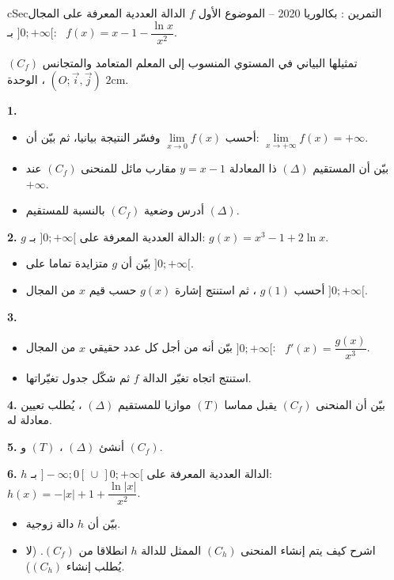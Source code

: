\documentclass[12pt,a4paper]{article}
\newenvironment{BOX}[2]{\begin{otherlanguage}{english}\begin{arbox}{#1}{#2}}{\end{arbox}\end{otherlanguage}}
\newcounter{exo}
\newenvironment{tamrin}[1]{\stepcounter{exo}\begin{BOX}{cSec}{التمرين \theexo: #1}}{\end{BOX}}
\newenvironment{sq}{\begin{itemize}[leftmargin=2.4em,itemsep=3pt]}{\end{itemize}}
\newcommand{\qa}{\item[(أ)]}\newcommand{\qb}{\item[(ب)]}\newcommand{\qc}{\item[(جـ)]}\newcommand{\qd}{\item[(د)]}\newcommand{\qe}{\item[(هـ)]}
\newcommand{\QQ}[1]{\par\smallskip\textbf{#1.} }
\begin{document}
\begin{tamrin}{بكالوريا 2020 -- الموضوع الأول}
$f$ الدالة العددية المعرفة على المجال $]0;+\infty[$ بـ: \ $f(x)=x-1-\dfrac{\ln x}{x^2}$.

$(C_f)$ تمثيلها البياني في المستوي المنسوب إلى المعلم المتعامد والمتجانس $(O;\vec i,\vec j)$ ، الوحدة $2\text{cm}$.
\QQ{1}
\begin{sq}
\qa أحسب $\lim\limits_{x\to0}f(x)$ وفسّر النتيجة بيانيا، ثم بيّن أن: $\lim\limits_{x\to+\infty}f(x)=+\infty$.
\qb بيّن أن المستقيم $(\Delta)$ ذا المعادلة $y=x-1$ مقارب مائل للمنحنى $(C_f)$ عند $+\infty$.
\qc أدرس وضعية $(C_f)$ بالنسبة للمستقيم $(\Delta)$.
\end{sq}
\QQ{2} $g$ الدالة العددية المعرفة على $]0;+\infty[$ بـ: $g(x)=x^3-1+2\ln x$.
\begin{sq}
\qa بيّن أن $g$ متزايدة تماما على $]0;+\infty[$.
\qb أحسب $g(1)$ ، ثم استنتج إشارة $g(x)$ حسب قيم $x$ من المجال $]0;+\infty[$.
\end{sq}
\QQ{3}
\begin{sq}
\qa بيّن أنه من أجل كل عدد حقيقي $x$ من المجال $]0;+\infty[$: \ $f'(x)=\dfrac{g(x)}{x^3}$.
\qb استنتج اتجاه تغيّر الدالة $f$ ثم شكّل جدول تغيّراتها.
\end{sq}
\QQ{4} بيّن أن المنحنى $(C_f)$ يقبل مماسا $(T)$ موازيا للمستقيم $(\Delta)$ ، يُطلب تعيين معادلة له.
\QQ{5} أنشئ $(\Delta)$ ، $(T)$ و $(C_f)$.
\QQ{6} $h$ الدالة العددية المعرفة على $]-\infty;0[\,\cup\,]0;+\infty[$ بـ: \ $h(x)=-|x|+1+\dfrac{\ln|x|}{x^2}$.
\begin{sq}
\qa بيّن أن $h$ دالة زوجية.
\qb اشرح كيف يتم إنشاء المنحنى $(C_h)$ الممثل للدالة $h$ انطلاقا من $(C_f)$. (لا يُطلب إنشاء $(C_h)$).
\end{sq}
\end{tamrin}
\end{document}
